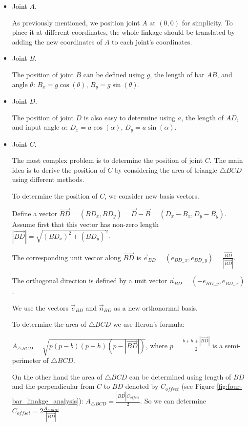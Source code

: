 \documentclass{article}
\begin{document}
 \begin{itemize}
 	\item Joint $A$.
 	
 	As previously mentioned, we position joint $A$ at $(0, 0)$ for simplicity. To place it at different coordinates, the whole linkage should be translated by adding the new coordinates of $A$ to each joint's coordinates.
 	
 	\item Joint $B$.
 	
 	The position of joint $B$ can be defined using $g$, the length of bar $AB$, and angle $\theta$: $B_x = g  \cos(\theta)$, $B_y = g \sin(\theta)$.
 	
 	\item Joint $D$.
 	
 	The position of joint $D$ is also easy to determine using $a$, the length of $AD$, and input angle $\alpha$: $D_x = a \cos(\alpha)$, $D_y = a \sin(\alpha)$.
 	
 	\item Joint $C$.
 	
 	The most complex problem is to determine the position of joint $C$. The main idea is to derive the position of $C$ by considering the area of triangle $\triangle BCD$ using different methods.
 	
 	To determine the position of $C$, we consider new basis vectors.
 	
 	Define a vector $\overrightarrow{BD} = (BD_x, BD_y) = \overrightarrow{D} - \overrightarrow{B} = (D_x - B_x, D_y - B_y)$. Assume first that this vector has non-zero length $|\overrightarrow{BD}| = \sqrt{(BD_x)^2+(BD_y)^2}$. 
 	
 	The corresponding unit vector along $\overrightarrow{BD}$ is $\overrightarrow{e}_{BD} = (e_{BD_-x}, e_{BD_-y}) = \frac{\overrightarrow{BD}}{|\overrightarrow{BD}|}$.
 	
 	The orthogonal direction is defined by a unit vector $\overrightarrow{n}_{BD} = (-e_{BD_-y}, e_{BD_-x})$.
 	
 	We use the vectors $\overrightarrow{e}_{BD}$ and $\overrightarrow{n}_{BD}$ as a new orthonormal basis.
 	
 	To determine the area of $\triangle BCD$ we use Heron's formula:
 	
 	$A_{\triangle BCD} = \sqrt{p (p-b) (p-h) (p-|\overrightarrow{BD}|)}$, where $p = \frac{b + h + |\overrightarrow{BD}|}{2}$ is a semi-perimeter of $\triangle BCD$.
 	
 	On the other hand the area of $\triangle BCD$ can be determined using length of $BD$ and the perpendicular from $C$ to $BD$ denoted by $C_{offset}$ (see Figure \ref{fig:four-bar_linakge_analysis}): $A_{\triangle BCD} = \frac{|\overrightarrow{BD}| C_{offset}}{2}$. So we can determine $C_{offset} = 2 \frac{A_{\triangle BCD}}{ |\overrightarrow{BD}|}$
 	

\end{itemize}
\end{document}

